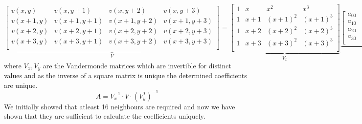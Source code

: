 \documentclass[a4paper, landscape]{article}
\begin{document}
\begin{equation}
    \underbrace{
    \begin{bmatrix}
        v(x,y) & v(x,y+1) & v(x,y+2) & v(x,y+3)\\
        v(x+1,y) & v(x+1,y+1) & v(x+1,y+2) & v(x+1,y+3)\\
        v(x+2,y) & v(x+2,y+1) & v(x+2,y+2) & v(x+2,y+3)\\
        v(x+3,y) & v(x+3,y+1) & v(x+3,y+2) & v(x+3,y+3)\\
    \end{bmatrix}
    }_{V}
    =
    \underbrace{
    \begin{bmatrix}
        1 & x & x^2 & x^3\\
        1 & x+1 & (x+1)^2 & (x+1)^3\\
        1 & x+2 & (x+2)^2 & (x+2)^3\\
        1 & x+3 & (x+3)^2 & (x+3)^3\\
    \end{bmatrix}
    }_{V_x}
    \underbrace{
    \begin{bmatrix}
        a_{00} & a_{01} & a_{02} & a_{03}\\
        a_{10} & a_{11} & a_{12} & a_{13}\\
        a_{20} & a_{21} & a_{22} & a_{23}\\
        a_{30} & a_{31} & a_{32} & a_{33}\\
    \end{bmatrix}
     }_{A}
    \underbrace{
    \begin{bmatrix}
        1 & 1 & 1 & 1 \\ y & y+1 & y+2 & y+3 \\y^2 & (y+1)^2 & (y+2)^2 & (y+3)^2  \\ y^3 & (y+1)^3 & (y+2)^3 & (y+3)^3
    \end{bmatrix}
     }_{V_y^T}
\end{equation}
where $V_x, V_y$ are the Vandermonde matrices which are invertible for distinct values and as the inverse of a square matrix is unique the determined coefficients are unique. 
\begin{equation}
    A = V_x^{-1}\cdot V \cdot (V_y^{T})^{-1}
\end{equation}
We initially showed that atleast 16 neighbours are required and now we have shown that they are sufficient to calculate the coefficients uniquely.
\end{document}

